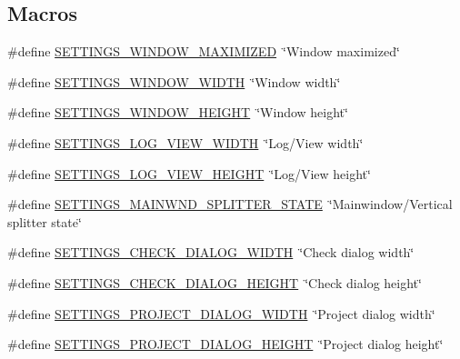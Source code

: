 \subsection*{Macros}
\begin{DoxyCompactItemize}
\item 
\#define \hyperlink{group___g_u_i_ga948a29f01fff9f79f62e3bf28d721786}{S\-E\-T\-T\-I\-N\-G\-S\-\_\-\-W\-I\-N\-D\-O\-W\-\_\-\-M\-A\-X\-I\-M\-I\-Z\-E\-D}~\char`\"{}Window maximized\char`\"{}
\item 
\#define \hyperlink{group___g_u_i_gab3316f9bbf9fa8608431448d0c21a197}{S\-E\-T\-T\-I\-N\-G\-S\-\_\-\-W\-I\-N\-D\-O\-W\-\_\-\-W\-I\-D\-T\-H}~\char`\"{}Window width\char`\"{}
\item 
\#define \hyperlink{group___g_u_i_ga1349b9b21752f6ae904d6685364f26a5}{S\-E\-T\-T\-I\-N\-G\-S\-\_\-\-W\-I\-N\-D\-O\-W\-\_\-\-H\-E\-I\-G\-H\-T}~\char`\"{}Window height\char`\"{}
\item 
\#define \hyperlink{group___g_u_i_ga49ce7e10a8ca5f794d1670cf698b84d1}{S\-E\-T\-T\-I\-N\-G\-S\-\_\-\-L\-O\-G\-\_\-\-V\-I\-E\-W\-\_\-\-W\-I\-D\-T\-H}~\char`\"{}Log/View width\char`\"{}
\item 
\#define \hyperlink{group___g_u_i_gad263dd98b69b300cd7af91b3a5e4b1eb}{S\-E\-T\-T\-I\-N\-G\-S\-\_\-\-L\-O\-G\-\_\-\-V\-I\-E\-W\-\_\-\-H\-E\-I\-G\-H\-T}~\char`\"{}Log/View height\char`\"{}
\item 
\#define \hyperlink{group___g_u_i_gab9ebf1be0995f1b3a67288de15b54c09}{S\-E\-T\-T\-I\-N\-G\-S\-\_\-\-M\-A\-I\-N\-W\-N\-D\-\_\-\-S\-P\-L\-I\-T\-T\-E\-R\-\_\-\-S\-T\-A\-T\-E}~\char`\"{}Mainwindow/Vertical splitter state\char`\"{}
\item 
\#define \hyperlink{group___g_u_i_ga4bab595d922c08534a339c0fbb87b18c}{S\-E\-T\-T\-I\-N\-G\-S\-\_\-\-C\-H\-E\-C\-K\-\_\-\-D\-I\-A\-L\-O\-G\-\_\-\-W\-I\-D\-T\-H}~\char`\"{}Check dialog width\char`\"{}
\item 
\#define \hyperlink{group___g_u_i_ga20e9e6c35e6cd57cf3fcedd2cfab084c}{S\-E\-T\-T\-I\-N\-G\-S\-\_\-\-C\-H\-E\-C\-K\-\_\-\-D\-I\-A\-L\-O\-G\-\_\-\-H\-E\-I\-G\-H\-T}~\char`\"{}Check dialog height\char`\"{}
\item 
\#define \hyperlink{group___g_u_i_ga7261803b3a7ee1dc4de038797ce95f4f}{S\-E\-T\-T\-I\-N\-G\-S\-\_\-\-P\-R\-O\-J\-E\-C\-T\-\_\-\-D\-I\-A\-L\-O\-G\-\_\-\-W\-I\-D\-T\-H}~\char`\"{}Project dialog width\char`\"{}
\item 
\#define \hyperlink{group___g_u_i_ga355dc7916dbac588172dd34ac8291958}{S\-E\-T\-T\-I\-N\-G\-S\-\_\-\-P\-R\-O\-J\-E\-C\-T\-\_\-\-D\-I\-A\-L\-O\-G\-\_\-\-H\-E\-I\-G\-H\-T}~\char`\"{}Project dialog height\char`\"{}

\end{DoxyCompactItemize}
